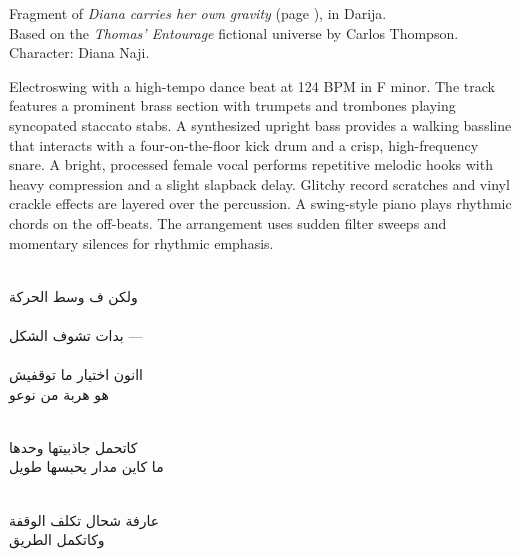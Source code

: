 

\begin{notes}
Fragment of \emph{Diana carries her own gravity} (page \pageref{sec:diana-carries-her-own-gravity}), in Darija.\\
Based on the \emph{Thomas’ Entourage} fictional universe by Carlos Thompson.\\
Character: Diana Naji.\\
\end{notes}

\begin{style}
Electroswing with a high-tempo dance beat at 124 BPM in F minor. %
The track features a prominent brass section with trumpets and trombones playing syncopated staccato stabs. %
A synthesized upright bass provides a walking bassline that interacts with a four-on-the-floor kick drum and a crisp, high-frequency snare. %
A bright, processed female vocal performs repetitive melodic hooks with heavy compression and a slight slapback delay. %
Glitchy record scratches and vinyl crackle effects are layered over the percussion. %
A swing-style piano plays rhythmic chords on the off-beats. %
The arrangement uses sudden filter sweeps and momentary silences for rhythmic emphasis.
\end{style}

\begin{lyrics}
\\
\textarabic{ولكن ف وسط الحركة}\\
\\
\textarabic{بدات تشوف الشكل —}\\
\\
\textarabic{اانون اختيار ما توقفيش}\\
\textarabic{هو هربة من نوعو}

\\
\textarabic{كاتحمل جاذبيتها وحدها}\\
\textarabic{ما كاين مدار يحبسها طويل}

\\
\textarabic{عارفة شحال تكلف الوقفة}\\
\textarabic{وكاتكمل الطريق}
\end{lyrics}

